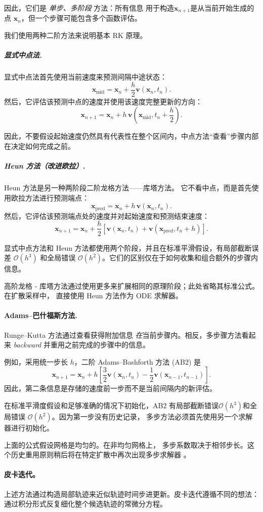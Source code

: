 因此，它们是 \emph{ 单步、多阶段 } 方法：所有信息
用于构造$\mathbf{x}_{n+1}$是从当前开始生成的点 $\mathbf{x}_n$，但一个步骤可能包含多个函数评估。

我们使用两种二阶方法来说明基本 RK 原理。

\subparagraph{显式中点法.}
显式中点法首先使用当前速度来预测间隔中途状态：
\[
\mathbf{x}_{\mathrm{mid}}
=
\mathbf{x}_n
+
\frac{h}{2}
\mathbf{v}(\mathbf{x}_n,t_n).
\]
然后，它评估该预测中点的速度并使用该速度完整更新的方向：
\[
\mathbf{x}_{n+1}
=
\mathbf{x}_n
+
h\,
\mathbf{v}
\left(
\mathbf{x}_{\mathrm{mid}},
t_n+\frac{h}{2}
\right).
\]

因此，不要假设起始速度仍然具有代表性在整个区间内，中点方法“查看”步骤内部在决定如何完成之前。


\subparagraph{Heun 方法（改进欧拉）.}
Heun 方法是另一种两阶段二阶龙格方法——库塔方法。
它不看中点，而是首先使用欧拉方法进行预测端点：
\[
\mathbf{x}_{\mathrm{pred}}
=
\mathbf{x}_n
+
h\,\mathbf{v}(\mathbf{x}_n,t_n).
\]
然后，它评估该预测端点处的速度并对起始速度和预测结束速度：
\[
\mathbf{x}_{n+1}
=
\mathbf{x}_n
+
\frac{h}{2}
\left[
\mathbf{v}(\mathbf{x}_n,t_n)
+
\mathbf{v}(\mathbf{x}_{\mathrm{pred}},t_n+h)
\right].
\]

显式中点方法和 Heun 方法都使用两个阶段，并且在标准平滑假设，有局部截断误差
$\mathcal O(h^3)$ 和全局错误 $\mathcal O(h^2)$。它们的区别仅在于如何收集和组合额外的步骤内信息。

高阶龙格 - 库塔方法通过使用更多来扩展相同的原理阶段；此处省略其标准公式。在扩散采样中，
\citet{karras2022elucidating} 直接使用 Heun 方法作为 ODE 求解器。


\paragraph{Adams--巴什福斯方法.}
Runge--Kutta 方法通过查看获得附加信息
\emph{在}当前步骤内。相反，多步骤方法看起来
\emph{backward} 并重用之前完成的步骤中的信息。

例如，采用统一步长 $h$，二阶
Adams--Bashforth 方法 (AB2) 是
\[
\mathbf{x}_{n+1}
=
\mathbf{x}_n
+
h
\left[
\frac{3}{2}
\mathbf{v}(\mathbf{x}_n,t_n)
-
\frac{1}{2}
\mathbf{v}(\mathbf{x}_{n-1},t_{n-1})
\right].
\]
因此，第二条信息是存储的速度前一步而不是当前间隔内的新评估。

在标准平滑度假设和足够准确的情况下初始化，AB2 有局部截断错误$\mathcal O(h^3)$和全局错误 $\mathcal O(h^2)$。因为第一步没有历史记录，
多步方法必须首先使用另一个求解器进行初始化。

上面的公式假设网格是均匀的。在非均匀网格上，
多步系数取决于相邻步长。这个历史重用原则稍后将在特定扩散中再次出现多步求解器
。\paragraph{皮卡迭代。}
上述方法通过构造局部轨迹来近似轨迹时间步进更新。皮卡迭代遵循不同的想法：
通过积分形式反复细化整个候选轨迹的常微分方程。

